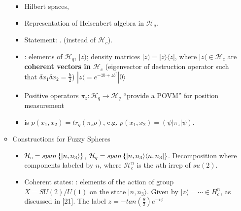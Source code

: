\documentclass{article}
\begin{document}
\begin{itemize}
\begin{itemize}
\begin{itemize}
            \item Hilbert spaces, 
            
            \item Representation of Heisenbert algebra in $\mathcal H_q$. 
            
            \item Statement: . (instead of $\mathcal H_c$).
            
            \item {}: elements of $\mathcal H_q$, $|z)$; density matrices $|z) = |z\rangle \langle z|$, where $|z\langle \in \mathcal H_c$ are \textbf{coherent vectors in $\mathcal H_c$} (eigenvector of destruction operator such that $\delta x_1 \delta x_2 = \frac{\hbar}{2}$) $|z\langle = e^{-\overline{z} b + z b^\dagger}|0\rangle$
            
            \item Positive operators $\pi_z: \mathcal H_q \to \mathcal H_q$ ``provide a POVM'' for position measurement
            
            \item {} is $p(x_1, x_2) = tr_q(\pi_z \rho)$, e.g. $p(x_1, x_2) = (\psi|\pi_z|\psi)$.
                
            \end{itemize}
        
        \item Constructions for Fuzzy Spheres
        
            \begin{itemize}
                
            \item $\mathcal H_c = span\left\{ |n, n_3\rangle \right\}$, $\mathcal H_q = span\left\{ |n, n_3\rangle \langle n, n_3| \right\}$. Decomposition where components labeled by $n$, where $\mathcal H_c^n$ is the $n$th irrep of $su(2)$.
            
            \item Coherent states: : elements of the action of group $X = SU(2)/U(1)$ on the state $|n, n_3\rangle$. Given by $|z\langle = \cdots \in H^n_c$, as discussed in [21]. The label $z = -tan(\frac{\theta}{2})e^{-i \phi}$
                

\end{itemize}
\end{itemize}
\end{itemize}
\end{document}
